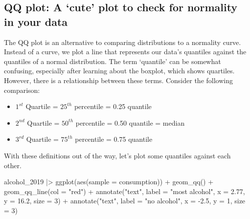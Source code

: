 \documentclass[
  letterpaper,
]{krantz}
\makeatletter
\newenvironment{Shaded}{\begin{snugshade}}{\end{snugshade}}
\newcommand{\AttributeTok}[1]{\textcolor[rgb]{0.40,0.45,0.13}{#1}}
\newcommand{\DecValTok}[1]{\textcolor[rgb]{0.68,0.00,0.00}{#1}}
\newcommand{\FloatTok}[1]{\textcolor[rgb]{0.68,0.00,0.00}{#1}}
\newcommand{\FunctionTok}[1]{\textcolor[rgb]{0.28,0.35,0.67}{#1}}
\newcommand{\NormalTok}[1]{\textcolor[rgb]{0.00,0.23,0.31}{#1}}
\newcommand{\SpecialCharTok}[1]{\textcolor[rgb]{0.37,0.37,0.37}{#1}}
\newcommand{\StringTok}[1]{\textcolor[rgb]{0.13,0.47,0.30}{#1}}
\newenvironment{kframe}{%
\medskip{}
\setlength{\fboxsep}{.8em}
 \def\at@end@of@kframe{}%
 \ifinner\ifhmode%
  \def\at@end@of@kframe{\end{minipage}}%
  \begin{minipage}{\columnwidth}%
 \fi\fi%
 \def\FrameCommand##1{\hskip\@totalleftmargin \hskip-\fboxsep
 \colorbox{shadecolor}{##1}\hskip-\fboxsep
     \hskip-\linewidth \hskip-\@totalleftmargin \hskip\columnwidth}%
 \MakeFramed {\advance\hsize-\width
   \@totalleftmargin\z@ \linewidth\hsize
   \@setminipage}}%
 {\par\unskip\endMakeFramed%
 \at@end@of@kframe}
\renewenvironment{Shaded}{\begin{kframe}}{\end{kframe}}
\makeatother
\begin{document}
\subsection{QQ plot: A `cute' plot to check for normality in your
data}\label{sec-qq-plot}

The QQ plot is an alternative to comparing distributions to a normality
curve. Instead of a curve, we plot a line that represents our data's
quantiles against the quantiles of a normal distribution. The term
`quantile' can be somewhat confusing, especially after learning about
the boxplot, which shows quartiles. However, there is a relationship
between these terms. Consider the following comparison:

\begin{itemize}
\item
  \(1^{st}\) Quartile = \(25^{th}\) percentile = 0.25 quantile
\item
  \(2^{nd}\) Quartile = \(50^{th}\) percentile = 0.50 quantile = median
\item
  \(3^{rd}\) Quartile = \(75^{th}\) percentile = 0.75 quantile
\end{itemize}

With these definitions out of the way, let's plot some quantiles against
each other.

\begin{Shaded}
\begin{Highlighting}[]
\NormalTok{alcohol\_2019 }\SpecialCharTok{|\textgreater{}}
  \FunctionTok{ggplot}\NormalTok{(}\FunctionTok{aes}\NormalTok{(}\AttributeTok{sample =}\NormalTok{ consumption)) }\SpecialCharTok{+}
  \FunctionTok{geom\_qq}\NormalTok{() }\SpecialCharTok{+}
  \FunctionTok{geom\_qq\_line}\NormalTok{(}\AttributeTok{col =} \StringTok{"red"}\NormalTok{) }\SpecialCharTok{+}
  \FunctionTok{annotate}\NormalTok{(}\StringTok{"text"}\NormalTok{,}
           \AttributeTok{label =} \StringTok{"most alcohol"}\NormalTok{,}
           \AttributeTok{x =} \FloatTok{2.77}\NormalTok{,}
           \AttributeTok{y =} \FloatTok{16.2}\NormalTok{,}
           \AttributeTok{size =} \DecValTok{3}\NormalTok{) }\SpecialCharTok{+}
  \FunctionTok{annotate}\NormalTok{(}\StringTok{"text"}\NormalTok{,}
           \AttributeTok{label =} \StringTok{"no alcohol"}\NormalTok{,}
           \AttributeTok{x =} \SpecialCharTok{{-}}\FloatTok{2.5}\NormalTok{,}
           \AttributeTok{y =} \DecValTok{1}\NormalTok{,}
           \AttributeTok{size =} \DecValTok{3}\NormalTok{)}
\end{Highlighting}
\end{Shaded}
\end{document}
